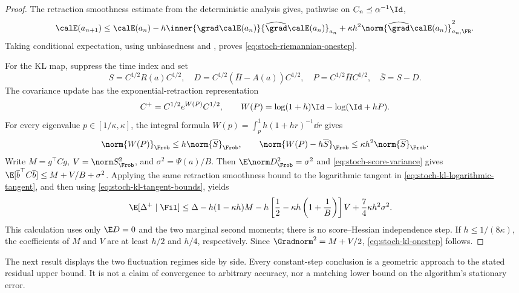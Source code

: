 \begin{proof}
The retraction smoothness estimate from the deterministic analysis gives,
pathwise on \(C_n\preceq\alpha^{-1}\Id\),
\[
  \calE(a_{n+1})
  \leq\calE(a_n)
  -h\inner{\grad\calE(a_n)}{\widehat{\grad}\calE(a_n)}_{a_n}
  +\kappa h^2\norm{\widehat{\grad}\calE(a_n)}_{a_n,\FR}^2.
\]
Taking conditional expectation, using unbiasedness and
, proves
\eqref{eq:stoch-riemannian-onestep}.

For the KL map, suppress the time index and set
\[
  S=C^{1/2}R(a)C^{1/2},
  \quad
  D=C^{1/2}(\overline H-A(a))C^{1/2},
  \quad
  P=C^{1/2}\overline HC^{1/2},
  \quad
  \overline S=S-D.
\]
The covariance update has the exponential-retraction representation
\begin{equation}
  C^+=C^{1/2}e^{W(P)}C^{1/2},
  \qquad
  W(P)=\log(1+h)\Id-\log(\Id+hP).
  \label{eq:stoch-kl-logarithmic-tangent}
\end{equation}
For every eigenvalue \(p\in[1/\kappa,\kappa]\), the integral formula
\(W(p)=\int_p^1h(1+hr)^{-1}\dd r\) gives
\begin{equation}
  \norm{W(P)}_{\Frob}\leq h\norm{\overline S}_{\Frob},
  \qquad
  \norm{W(P)-h\overline S}_{\Frob}
  \leq\kappa h^2\norm{\overline S}_{\Frob}.
  \label{eq:stoch-kl-tangent-bounds}
\end{equation}
Write
\(M=g^\top Cg\), \(V=\norm S_{\Frob}^2\), and
\(\sigma^2=\Psi(a)/B\).  Then
\(\E\norm D_{\Frob}^2=\sigma^2\) and
\eqref{eq:stoch-score-variance} gives
\(\E[\overline b^\top C\overline b]\leq M+V/B+\sigma^2\).
Applying the same retraction smoothness bound to the logarithmic tangent in
\eqref{eq:stoch-kl-logarithmic-tangent}, and then using
\eqref{eq:stoch-kl-tangent-bounds}, yields
\[
\begin{split}
  \E[\Delta^+\mid\Fil]
  \leq{}&\Delta-h(1-\kappa h)M
  -h\left[\frac12-\kappa h\left(1+\frac1B\right)\right]V
  +\frac74\kappa h^2\sigma^2.
\end{split}
\]
This calculation uses only \(\E D=0\) and the two marginal second moments;
there is no score--Hessian independence step.  If
\(h\leq1/(8\kappa)\), the coefficients of \(M\) and \(V\) are at least
\(h/2\) and \(h/4\), respectively.  Since
\(\Gradnorm^2=M+V/2\), \eqref{eq:stoch-kl-onestep} follows.
\end{proof}

The next result displays the two fluctuation regimes side by side.  Every
constant-step conclusion is a geometric approach to the stated residual
upper bound.  It is not a claim of convergence to arbitrary accuracy, nor a
matching lower bound on the algorithm's stationary error.

